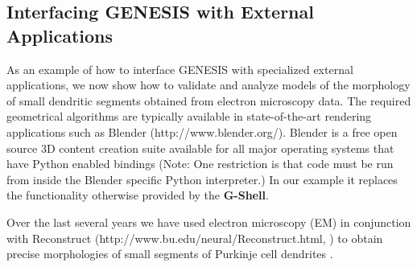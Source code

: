 \documentclass[10pt]{article}
\begin{document}
\subsection*{Interfacing GENESIS with External Applications}


As an example of how to interface GENESIS with specialized external
applications, we now show how to validate and analyze models of the
morphology of small dendritic segments obtained from electron
microscopy data.  The required geometrical algorithms are typically
available in state-of-the-art rendering applications such as  Blender
(http://www.blender.org/). Blender is a free open source 3D content creation
suite available for all major operating systems that have Python
enabled bindings (Note: One restriction is that code must be run
  from inside the Blender specific Python interpreter.) In our
example it replaces the functionality otherwise provided by the
{\bf G-Shell}.

Over the last several years we have used electron microscopy (EM) in conjunction
with Reconstruct (http://www.bu.edu/neural/Reconstruct.html, \cite{jc05:_recon}) to obtain precise
morphologies of small segments of Purkinje cell
dendrites \cite{huo09:_purkin, cornelis08:_model_neuros_genes}.

\end{document}
